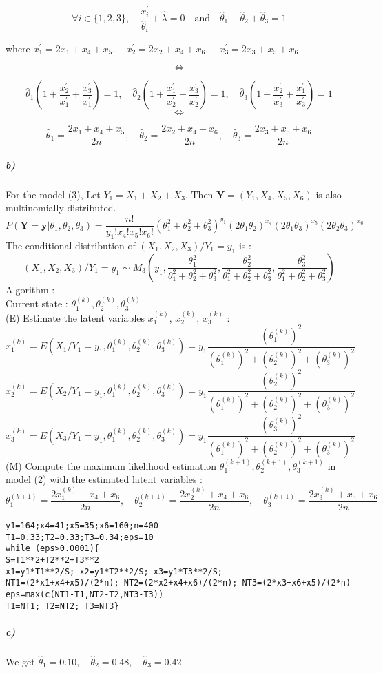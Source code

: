 \documentclass{article}
\begin{document}
$$ \forall i \in \{1,2,3\}, \quad \dfrac{x_i^{'}}{\widehat{\theta}_i}+{\widehat{\lambda}}=0 \quad \text{and} \quad 
 \widehat{\theta}_1 + \widehat{\theta}_2 + \widehat{\theta}_3=1$$
\begin{center}
where $x_1^{'}=2x_1+x_4+x_5, \quad x_2^{'}=2x_2+x_4+x_6, \quad x_3^{'}=2x_3+x_5+x_6$ 
\end{center}
$$\iff$$

$$\widehat{\theta}_1(1+\dfrac{x_2^{'}}{x_1^{'}}+\dfrac{x_3^{'}}{x_1^{'}})=1,\quad \widehat{\theta}_2(1+\dfrac{x_1^{'}}{x_2^{'}}+\dfrac{x_3^{'}}{x_2^{'}})=1,
\quad \widehat{\theta}_3(1+\dfrac{x_2^{'}}{x_3^{'}}+\dfrac{x_1^{'}}{x_3^{'}})=1 $$
$$\iff$$

$$\widehat{\theta}_1=\dfrac{2x_1+x_4+x_5}{2n},\quad \widehat{\theta}_2=\dfrac{2x_2+x_4+x_6}{2n},
\quad \widehat{\theta}_3=\dfrac{2x_3+x_5+x_6}{2n} $$
\subparagraph{b)}
For the model (3), Let $Y_1=X_1+X_2+X_3$. Then $\pmb{Y}=(Y_1,X_4,X_5,X_6)$ is also multinomially distributed.
$$ P(\pmb{Y}=\pmb{y}|\theta_1,\theta_2,\theta_3)=\dfrac{n!}{y_1!x_4!x_5!x_6!}(\theta_1^2+\theta_2^2+\theta_3^2)^{y_1}(2 \theta_1 \theta_2)^{x_4}(2\theta_1\theta_3)^{x_5}(2\theta_2\theta_3)^{x_6}$$
The conditional distribution of $(X_1,X_2,X_3)/Y_1=y_1$ is :
$$ (X_1,X_2,X_3)/Y_1=y_1 \sim M_3(y_1,\dfrac{\theta_1^2}{\theta_1^2+\theta_2^2+\theta_3^2},\dfrac{\theta_2^2}{\theta_1^2+\theta_2^2+\theta_3^2},\dfrac{\theta_3^2}{\theta_1^2+\theta_2^2+\theta_3^2}) $$ 
Algorithm : \\
Current state : $\theta_1^{(k)},\theta_2^{(k)},\theta_3^{(k)}$\\
(E) Estimate the latent variables $x_1^{(k)}$, $x_2^{(k)}$, $x_3^{(k)}$ :
$$x_1^{(k)}=E(X_1/Y_1=y_1,\theta_1^{(k)},\theta_2^{(k)},\theta_3^{(k)})=y_1\dfrac{(\theta_1^{(k)})^2}{(\theta_1^{(k)})^2+(\theta_2^{(k)})^2+(\theta_3^{(k)})^2}$$
$$x_2^{(k)}=E(X_2/Y_1=y_1,\theta_1^{(k)},\theta_2^{(k)},\theta_3^{(k)})=y_1\dfrac{(\theta_2^{(k)})^2}{(\theta_1^{(k)})^2+(\theta_2^{(k)})^2+(\theta_3^{(k)})^2}$$
$$x_3^{(k)}=E(X_3/Y_1=y_1,\theta_1^{(k)},\theta_2^{(k)},\theta_3^{(k)})=y_1\dfrac{(\theta_3^{(k)})^2}{(\theta_1^{(k)})^2+(\theta_2^{(k)})^2+(\theta_3^{(k)})^2}$$
(M) Compute the maximum likelihood estimation $\theta_1^{(k+1)},\theta_2^{(k+1)},\theta_3^{(k+1)}$ in model (2) with
the estimated latent variables :
$$\theta_1^{(k+1)}=\dfrac{2x_1^{(k)}+x_4+x_6}{2n},
\quad \theta_2^{(k+1)}=\dfrac{2x_2^{(k)}+x_4+x_6}{2n},
\quad \theta_3^{(k+1)}=\dfrac{2x_3^{(k)}+x_5+x_6}{2n}$$
\begin{footnotesize}
\begin{verbatim}
y1=164;x4=41;x5=35;x6=160;n=400
T1=0.33;T2=0.33;T3=0.34;eps=10
while (eps>0.0001){
S=T1**2+T2**2+T3**2
x1=y1*T1**2/S; x2=y1*T2**2/S; x3=y1*T3**2/S;
NT1=(2*x1+x4+x5)/(2*n); NT2=(2*x2+x4+x6)/(2*n); NT3=(2*x3+x6+x5)/(2*n)
eps=max(c(NT1-T1,NT2-T2,NT3-T3))
T1=NT1; T2=NT2; T3=NT3}
\end{verbatim}
\end{footnotesize}
\subparagraph{c)}

We get $\widehat{\theta}_1=0.10,\quad \widehat{\theta}_2=0.48,
\quad \widehat{\theta}_3=0.42 $.
\end{document}
